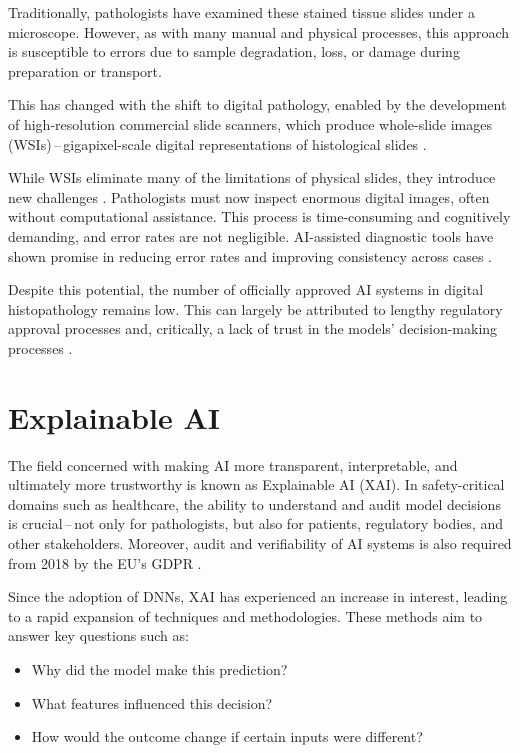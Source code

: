 Traditionally, pathologists have examined these stained tissue slides under a microscope.
However, as with many manual and physical processes, this approach is susceptible to errors due to sample degradation, loss, or damage during preparation or transport.

This has changed with the shift to digital pathology, enabled by the development of high-resolution commercial slide scanners,
which produce whole-slide images (WSIs)\,--\,gigapixel-scale digital representations of histological slides \cite{cooper2023machine}.

While WSIs eliminate many of the limitations of physical slides,
they introduce new challenges \cite{aeffner2019introduction}.
Pathologists must now inspect enormous digital images,
often without computational assistance. This process is time-consuming and cognitively demanding,
and error rates are not negligible. AI-assisted diagnostic tools have shown promise in reducing error rates
and improving consistency across cases \cite{dy2024ai}.

Despite this potential, the number of officially approved AI systems in digital histopathology remains low.
This can largely be attributed to lengthy regulatory approval processes and,
critically, a lack of trust in the models' decision-making processes \cite{aggarwal2025artificial}.


\section{Explainable AI}

The field concerned with making AI more transparent, interpretable, and ultimately more trustworthy is known as Explainable AI (XAI).
In safety-critical domains such as healthcare, the ability to understand and audit model decisions is crucial\,--\,not only for pathologists,
but also for patients, regulatory bodies, and other stakeholders. Moreover, audit and verifiability of AI systems is also required from 2018 by the EU's GDPR \cite{goodman2017european}.

\newpage

Since the adoption of DNNs, XAI has experienced an increase in interest,
leading to a rapid expansion of techniques and methodologies.
These methods aim to answer key questions such as:
\begin{itemize}
    \item Why did the model make this prediction?
    \item What features influenced this decision?
    \item How would the outcome change if certain inputs were different?
\end{itemize}

